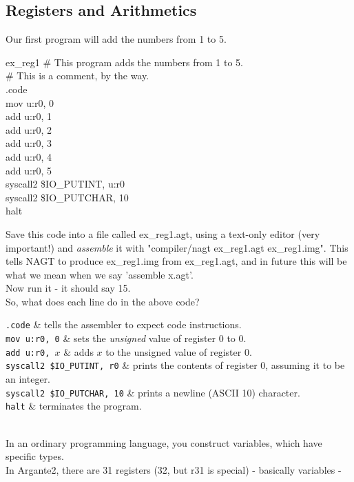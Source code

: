 \documentclass[a4paper,oneside,openany]{book}
\begin{document}
\subsection{Registers and Arithmetics}
Our first program will add the numbers from 1 to 5.
\begin{codefile}{ex\_reg1}
\# This program adds the numbers from 1 to 5.\\
\# This is a comment, by the way.\\
.code\\
\>	mov u:r0, 0\\
\>	add u:r0, 1\\
\>	add u:r0, 2\\
\>	add u:r0, 3\\
\>	add u:r0, 4\\
\>	add u:r0, 5\\
\>	syscall2 \$IO\_PUTINT, u:r0\\
\>	syscall2 \$IO\_PUTCHAR, 10\\
\>	halt
\end{codefile}
Save this code into a file called ex\_reg1.agt, using a text-only editor (very important!)  and \emph{assemble} it with "compiler/nagt ex\_reg1.agt ex\_reg1.img". This tells NAGT to produce ex\_reg1.img from ex\_reg1.agt, and in future this will be what we mean when we say 'assemble x.agt'.\\
Now run it - it should say 15.\\
So, what does each line do in the above code?\\
\begin{codetable}
\texttt{.code} & tells the assembler to expect code instructions.\\
\texttt{mov u:r0, 0} & sets the \emph{unsigned} value of register 0 to $0$.\\
\texttt{add u:r0, $x$} & adds $x$ to the unsigned value of register 0.\\
\texttt{syscall2 \$IO\_PUTINT, r0} & prints the contents of register 0, assuming
it to be an integer.\\
\texttt{syscall2 \$IO\_PUTCHAR, 10} & prints a newline (ASCII 10) character.\\
\texttt{halt} & terminates the program.\\
\end{codetable}\medskip\\
In an ordinary programming language, you construct variables, which have specific types.\\
In Argante2, there are 31 registers (32, but r31 is special) - basically variables -
\end{document}
